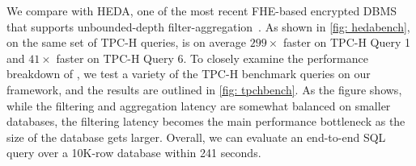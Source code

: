 We compare \NAME with HEDA, one of the most recent FHE-based encrypted DBMS
that supports unbounded-depth filter-aggregation~\cite{heda}. As shown in 
\cref{fig: hedabench}, on the same set of TPC-H queries, \NAME 
is on average $299\times$ faster on TPC-H Query 1 and $41\times$ faster on 
TPC-H Query 6. To closely examine the performance breakdown of \NAME,
we test a variety of the TPC-H benchmark queries on our \NAME framework, 
and the results are outlined in \cref{fig: tpchbench}. As the figure shows, while 
the filtering and aggregation latency are somewhat balanced on smaller databases,  
the filtering latency becomes the main performance bottleneck
as the size of the database gets larger. Overall, we can evaluate an end-to-end
SQL query over a 10K-row database within 241 seconds.